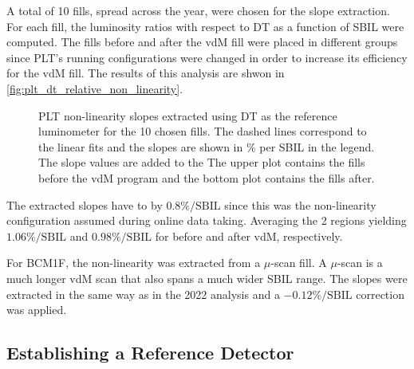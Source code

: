 A total of 10 fills, spread across the year, were chosen for the slope extraction. For each fill, the luminosity ratios with respect to DT as a function of SBIL were computed. The fills before and after the vdM fill were placed in different groups since PLT's running configurations were changed in order to increase its efficiency for the vdM fill. The results of this analysis are shwon in \autoref{fig:plt_dt_relative_non_linearity}.

\begin{figure}[!htb]
	\centering
	\caption[PLT relative non-linearity slopes]{PLT non-linearity slopes extracted using DT as the reference luminometer for the 10 chosen fills. The dashed lines correspond to the linear fits and the slopes are shown in \% per SBIL in the legend. The slope values are added to the The upper plot contains the fills before the vdM program and the bottom plot contains the fills after.}
	\label{fig:plt_dt_relative_non_linearity}
\end{figure}

The extracted slopes have to by $0.8\%/\text{SBIL}$ since this was the non-linearity configuration assumed during online data taking. Averaging the 2 regions yielding $1.06\%/\text{SBIL}$ and $0.98\%/\text{SBIL}$ for before and after vdM, respectively. 

For BCM1F, the non-linearity was extracted from a $\mu$-scan fill. A $\mu$-scan is a much longer vdM scan that also spans a much wider SBIL range. The slopes were extracted in the same way as in the 2022 analysis \cite{CMS-PAS-LUM-22-001} and a $-0.12\%/\text{SBIL}$ correction was applied.

\subsection{Establishing a Reference Detector}

